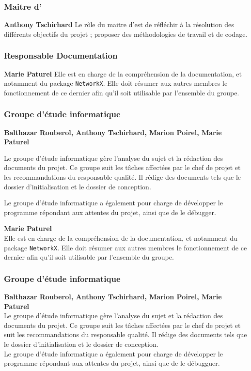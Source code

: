 \subsubsection{Maitre d'\oeuvre}
\textbf{Anthony Tschirhard}
Le rôle du maitre d'\oeuvre est de réfléchir à la résolution des différents objectifs du projet ; proposer des méthodologies de travail et de codage.

\subsubsection{Responsable Documentation}
\textbf{Marie Paturel}
Elle est en charge de la compréhension de la documentation, et notamment du package \verb?NetworkX?. Elle doit résumer aux autres membres le fonctionnement de ce dernier afin qu'il soit utilisable par l'ensemble du groupe.

\subsubsection{Groupe d'étude informatique}
\textbf{Balthazar Rouberol, Anthony Tschirhard, Marion Poirel, Marie Paturel}

Le groupe d'étude informatique gère l'analyse du sujet et la rédaction des documents du projet. Ce groupe suit les tâches affectées par le chef de projet et les recommandations du responsable qualité. Il rédige des documents tels que le dossier d'initialisation et le dossier de conception.

Le groupe d'étude informatique a également pour charge de développer le programme répondant aux attentes du projet, ainsi que de le débugger.


\textbf{Marie Paturel}\\
Elle est en charge de la compréhension de la documentation, et notamment du package \texttt{NetworkX}. Elle doit résumer aux autres membres le fonctionnement de ce dernier afin qu'il soit utilisable par l'ensemble du groupe.

\subsubsection{Groupe d'étude informatique}
\textbf{Balthazar Rouberol, Anthony Tschirhard, Marion Poirel, Marie Paturel}\\
Le groupe d'étude informatique gère l'analyse du sujet et la rédaction des documents du projet. Ce groupe suit les tâches affectées par le chef de projet et suit les recommandations du responsable qualité. Il rédige des documents tels que le dossier d'initialisation et le dossier de conception.\\
Le groupe d'étude informatique a également pour charge de développer le programme répondant aux attentes du projet, ainsi que de le débugguer.


